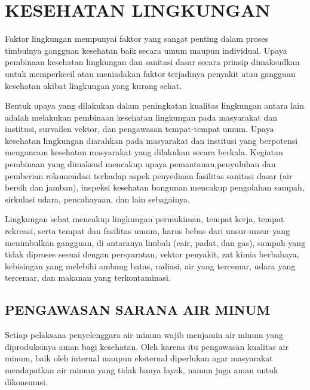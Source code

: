 \chapter{KESEHATAN LINGKUNGAN}
Faktor lingkungan mempunyai faktor yang sangat penting dalam proses timbulnya gangguan kesehatan baik secara umum maupun individual. Upaya pembinaan kesehatan lingkungan dan sanitasi dasar secara prinsip dimaksudkan untuk memperkecil atau meniadakan faktor terjadinya penyakit atau gangguan kesehatan akibat lingkungan yang kurang sehat. 

Bentuk upaya yang dilakukan dalam peningkatan kualitas lingkungan antara lain adalah melakukan pembinaan kesehatan lingkungan pada masyarakat dan institusi, survailen vektor, dan pengawasan tempat-tempat umum. Upaya kesehatan lingkungan diarahkan pada masyarakat dan institusi yang berpotensi mengancam kesehatan masyarakat yang dilakukan secara berkala. Kegiatan pembinaan yang dimaksud mencakup upaya pemantauan,penyuluhan dan pemberian rekomendasi terhadap aspek penyediaan fasilitas sanitasi dasar (air bersih dan jamban), inspeksi kesehatan bangunan mencakup pengolahan sampah, sirkulasi udara, pencahayaan, dan lain sebagainya.

Lingkungan sehat mencakup lingkungan permukiman, tempat kerja, tempat rekreasi, serta tempat dan fasilitas umum, harus bebas dari unsur-unsur yang menimbulkan gangguan, di antaranya limbah (cair, padat, dan gas), sampah yang tidak diproses sesuai dengan persyaratan, vektor penyakit, zat kimia berbahaya, kebisingan yang melebihi ambang batas, radiasi, air yang tercemar, udara yang tercemar, dan makanan yang terkontaminasi.

\section{PENGAWASAN SARANA AIR MINUM}
Setiap pelaksana penyelenggara air minum wajib menjamin air minum yang diproduksinya aman bagi kesehatan. Oleh karena itu pengawasan kualitas air minum, baik oleh internal maupun eksternal diperlukan agar masyarakat mendapatkan air minum yang tidak hanya layak, namun juga aman untuk dikonsumsi.

